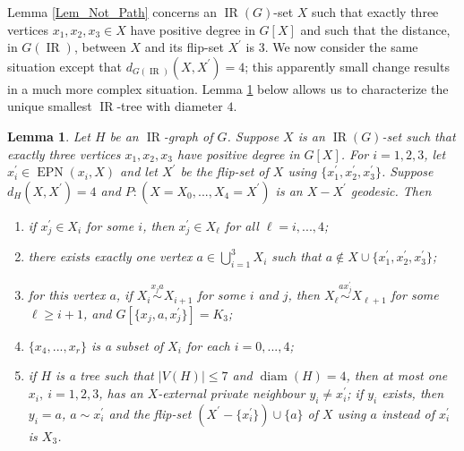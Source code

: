 \documentclass[12pt]{article}%
\newtheorem{lemma}[theorem]{Lemma}
\begin{document}
Lemma \ref{Lem_Not_Path} concerns an $\operatorname{IR}(G)$-set $X$ such that
exactly three vertices $x_{1},x_{2},x_{3}\in X$ have positive degree in $G[X]$
and such that the distance, in $G(\operatorname{IR})$, between $X$ and its
flip-set $X^{\prime}$ is $3$. We now consider the same situation except that
$d_{G(\operatorname{IR})}(X,X^{\prime})=4$; this apparently small change
results in a much more complex situation. Lemma \ref{Lem_Tec} below allows us
to characterize the unique smallest $\operatorname{IR}$-tree with diameter
$4$. 

\begin{lemma}
\label{Lem_Tec}Let $H$ be an $\operatorname{IR}$-graph of $G$. Suppose $X$ is
an $\operatorname{IR}(G)$-set such that exactly three vertices $x_{1}%
,x_{2},x_{3}$ have positive degree in $G[X]$. For $i=1,2,3$, let
$x_{i}^{\prime}\in\operatorname{EPN}(x_{i},X)$ and let $X^{\prime}$ be the
flip-set of $X$ using $\{x_{1}^{\prime},x_{2}^{\prime},x_{3}^{\prime}\}$.
Suppose $d_{H}(X,X^{\prime})=4$ and $P:(X=X_{0},...,X_{4}=X^{\prime})$ is an
$X-X^{\prime}$ geodesic. Then

\begin{enumerate}
\item[$(i)$] if $x_{j}^{\prime}\in X_{i}$ for some $i$, then $x_{j}^{\prime
}\in X_{\ell}$ for all $\ell=i,...,4$;

\item[$(ii)$] there exists exactly one vertex $a\in\bigcup_{i=1}^{3}X_{i}$
such that $a\notin X\cup\{x_{1}^{\prime},x_{2}^{\prime},x_{3}^{\prime}\}$;

\item[$(iii)$] for this vertex $a$, if $X_{i}\overset{x_{j}a}{\sim}X_{i+1}$
for some $i$ and $j$, then $X_{\ell}\overset{ax_{j}^{\prime}}{\sim}X_{\ell+1}$
for some $\ell\geq i+1$, and $G[\{x_{j},a,x_{j}^{\prime}\}]=K_{3}$;

\item[$(iv)$] $\{x_{4},...,x_{r}\}$ is a subset of $X_{i}$ for each
$i=0,...,4$;

\item[$(v)$] if $H$ is a tree such that $|V(H)|\leq7$ and $\operatorname{diam}%
(H)=4$, then at most one $x_{i},\ i=1,2,3$, has an $X$-external private
neighbour $y_{i}\neq x_{i}^{\prime}$; if $y_{i}$ exists, then $y_{i}=a$,
$a\sim x_{i}^{\prime}$ and the flip-set $(X^{\prime}-\{x_{i}^{\prime}%
\})\cup\{a\}$ of $X$ using $a$ instead of $x_{i}^{\prime}$ is $X_{3}$.
\end{enumerate}
\end{lemma}
\end{document}
